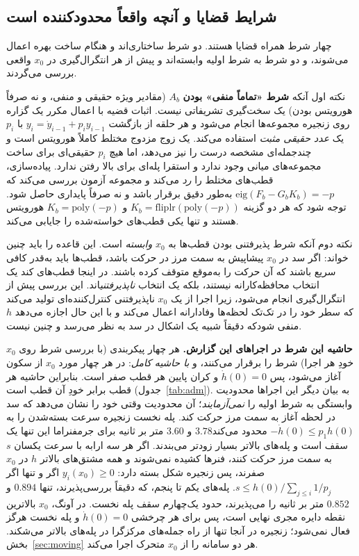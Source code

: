 \documentclass[10pt,twocolumn]{article}
\newcommand{\md}{\lr{\textemdash}}
\newcommand{\nd}{\lr{\textendash}}
\begin{document}
\subsection{شرایط قضایا و آنچه واقعاً محدودکننده است}
چهار شرط همراه قضایا هستند. دو شرط ساختاری‌اند و هنگام ساخت بهره اعمال می‌شوند،
و دو شرط به شرط اولیه وابسته‌اند و پیش از هر انتگرال‌گیری در $x_0$ واقعی بررسی
می‌گردند.

نکته اول آنکه \textbf{شرط «تماماً منفی» بودن} $A_b$ (مقادیر ویژه حقیقی و منفی،
و نه صرفاً هورویتس بودن) یک سخت‌گیری تشریفاتی نیست. اثبات قضیه با اعمال
مکرر یک گزاره روی زنجیره مجموعه‌ها انجام می‌شود و هر حلقه از بازگشت
$y_i = \dot{y}_{i-1} + p_i y_{i-1}$ با $p_i$ یک \emph{عدد حقیقی مثبت} استفاده
می‌کند. یک زوج مزدوج مختلط کاملاً هورویتس است و چندجمله‌ای مشخصه درست را نیز
می‌دهد، اما هیچ $p_i$ حقیقی‌ای برای ساخت مجموعه‌های میانی وجود ندارد و استقرا
پله‌ای برای بالا رفتن ندارد. پیاده‌سازی، قطب‌های مختلط را \emph{رد} می‌کند و
مجموعه آزمون بررسی می‌کند که $\mathrm{eig}(F_b - G_b K_b) = -p$ به‌طور دقیق
برقرار باشد و نه صرفاً پایداری حاصل شود. توجه شود که هر دو گزینه
$K_b = \mathrm{fliplr}(\mathrm{poly}(-p))$ و $K_b=\mathrm{poly}(-p)$ هورویتس
هستند و تنها یکی قطب‌های خواسته‌شده را جایابی می‌کند.

نکته دوم آنکه شرط پذیرفتنی بودن قطب‌ها به $x_0$ \emph{وابسته} است. این قاعده را
باید چنین خواند: اگر سد در $x_0$ پیشاپیش به سمت مرز در حرکت باشد، قطب‌ها باید
به‌قدر کافی سریع باشند که آن حرکت را به‌موقع متوقف کرده باشند. در اینجا
قطب‌های کند یک انتخاب محافظه‌کارانه نیستند، بلکه یک انتخاب \emph{ناپذیرفتنی}اند.
این بررسی پیش از انتگرال‌گیری انجام می‌شود، زیرا اجرا از یک $x_0$ ناپذیرفتنی
کنترل‌کننده‌ای تولید می‌کند که سطر خود را در تک‌تک لحظه‌ها وفادارانه اعمال
می‌کند و با این حال اجازه می‌دهد $h$ منفی شود\md{}که دقیقاً شبیه یک اشکال در سد به
نظر می‌رسد و چنین نیست.

\textbf{حاشیه این شرط در اجراهای این گزارش.} هر چهار پیکربندی
(با بررسی شرط روی $x_0$ خودِ هر اجرا) شرط را برقرار می‌کنند، و
\emph{با حاشیه کامل}: در هر چهار مورد $x_0$ از سکون آغاز می‌شود، پس $\dot h(0)=0$
و کران پایین هر قطب صفر است. بنابراین حاشیه هر قطب برابر خودِ آن قطب است
(جدول~\ref{tab:adm}). به بیان دیگر این اجراها محدودیت وابستگی به شرط اولیه را
\emph{نمی‌آزمایند}؛ آن محدودیت وقتی خود را نشان می‌دهد که سد در لحظه آغاز به
سمت مرز حرکت کند. پله نخست زنجیره سرعت بسته‌شدن را به $-\dot h(0)\le p_1h(0)$
محدود می‌کند\md{}$3.78$ و $3.60$ متر بر ثانیه برای جرم\nd{}فنر\md{}اما این تنها یک
سقف است و پله‌های بالاتر بسیار زودتر می‌بندند. اگر هر سه ارابه با سرعت یکسان $s$ به
سمت مرز حرکت کنند، فنرها کشیده نمی‌شوند و همه مشتق‌های بالاتر $h$ در $x_0$ صفرند، پس
زنجیره شکل بسته دارد: $y_i(x_0)\ge0$ اگر و تنها اگر $s\le h(0)/\sum_{j\le i}1/p_j$.
پله‌های یکم تا پنجم، که دقیقاً بررسی‌پذیرند، تنها $0.894$ و $0.852$ متر بر ثانیه را
می‌پذیرند، حدود یک‌چهارم سقف پله نخست. در آونگ، $x_0$ بالاترین نقطه دایره مجری
نهایی است، پس برای هر چرخشی $\dot h(0)=0$ و پله نخست هرگز فعال نمی‌شود؛ زنجیره در
آنجا تنها از راه جمله‌های مرکزگرا در پله‌های بالاتر می‌شکند. بخش~\ref{sec:moving} هر
دو سامانه را از $x_0$ متحرک اجرا می‌کند.
\end{document}
